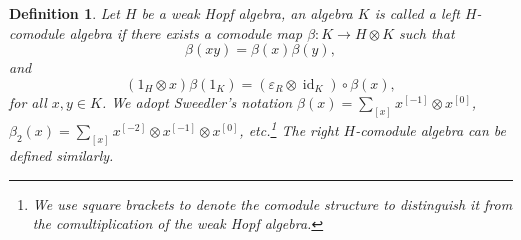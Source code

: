 \documentclass[a4paper,11pt]{article}
\theoremstyle{theorem}
\newtheorem{definition}{Definition}
\theoremstyle{remark}
\newcommand{\id}{\operatorname{id}}
\begin{document}
\begin{definition}\label{defintion:comoduleAlge}
Let \(H\) be a weak Hopf algebra, an algebra \( K \) is called a left \( H \)-comodule algebra \cite{Bohmdoihopf} if there exists a comodule map \( \beta: K \to H \otimes K \) such that 
\begin{equation}
    \beta(xy) = \beta(x) \beta(y),
\end{equation}
and 
\begin{equation} \label{eq:weakComodulealge}
    (1_H \otimes x) \beta(1_{K}) = (\varepsilon_R \otimes \id_K) \circ \beta(x),
\end{equation}
for all \( x, y \in K \). We adopt Sweedler's notation \( \beta(x) = \sum_{[x]} x^{[-1]} \otimes x^{[0]} \), \( \beta_2(x) = \sum_{[x]} x^{[-2]} \otimes x^{[-1]} \otimes x^{[0]} \), etc.\footnote{We use square brackets to denote the comodule structure to distinguish it from the comultiplication of the weak Hopf algebra.} The right \( H \)-comodule algebra can be defined similarly.
\end{definition}
\end{document}
